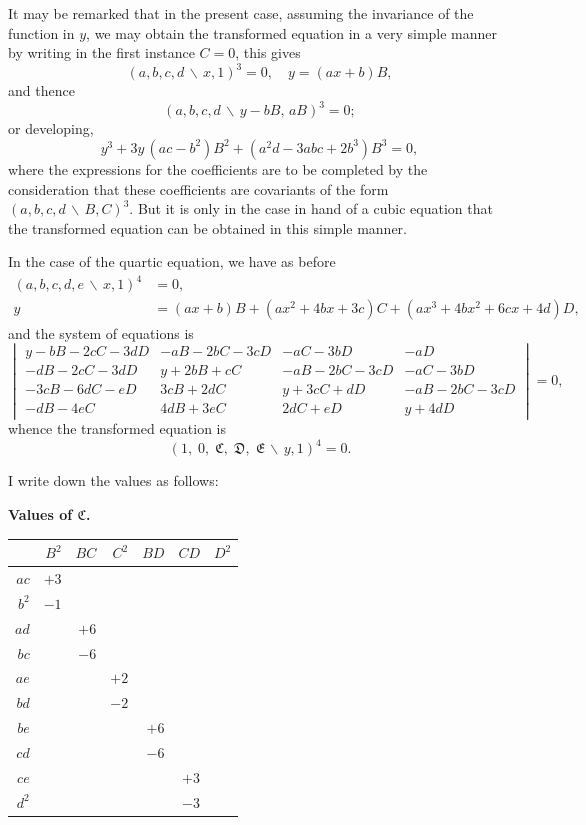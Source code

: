 \documentclass[11pt,a4paper]{book}
\begin{document}
\newpage

It may be remarked that in the present case, assuming the invariance of the function
in $y$, we may obtain the transformed equation in a very simple manner by writing in the
first instance $C=0$, this gives
\[(a,b,c,d\,\backslash\!\!\,x,1)^{3} = 0, \quad y = (ax+b)B,\]
and thence
\[(a,b,c,d\,\backslash\!\!\,y-bB,\, aB)^{3} = 0;\]
or developing,
\[y^{3} + 3y\,(ac-b^{2})B^{2} + (a^{2}d-3abc+2b^{3})B^{3} = 0,\]
where the expressions for the coefficients are to be completed by the consideration that
these coefficients are covariants of the form $(a,b,c,d\,\backslash\!\!\,B,C)^{3}$. But it is only in
the case in hand of a cubic equation that the transformed equation can be obtained in
this simple manner.

In the case of the quartic equation, we have as before
\begin{align*}
(a,b,c,d,e\,\backslash\!\!\,x,1)^{4} &= 0,\\
y &= (ax+b)B + (ax^{2}+4bx+3c)C + (ax^{3}+4bx^{2}+6cx+4d)D,
\end{align*}
and the system of equations is
\[
\begin{vmatrix}
y-bB-2cC-3dD & -aB-2bC-3cD & -aC-3bD & -aD \\
-dB-2cC-3dD & y+2bB+cC & -aB-2bC-3cD & -aC-3bD \\
-3cB-6dC-eD & 3cB+2dC & y+3cC+dD & -aB-2bC-3cD \\
-dB-4eC & 4dB+3eC & 2dC+eD & y+4dD
\end{vmatrix}
= 0,
\]
whence the transformed equation is
\[(1,\; 0,\; \mathfrak{C},\; \mathfrak{D},\; \mathfrak{E}\,\backslash\!\!\,y,1)^{4} = 0.\]

I write down the values as follows:

\begin{center}
\renewcommand{\arraystretch}{1.2}
\textbf{Values of $\mathfrak{C}$.}
\begin{tabular}{r|rrrrrr}
& $B^{2}$ & $BC$ & $C^{2}$ & $BD$ & $CD$ & $D^{2}$ \\
\hline
$ac$ & $+3$ \\
$b^{2}$ & $-1$ \\
$ad$ & & $+6$ \\
$bc$ & & $-6$ \\
$ae$ & & & $+2$ \\
$bd$ & & & $-2$ \\
$be$ & & & & $+6$ \\
$cd$ & & & & $-6$ \\
$ce$ & & & & & $+3$ \\
$d^{2}$ & & & & & $-3$
\end{tabular}
\end{center}
\end{document}

